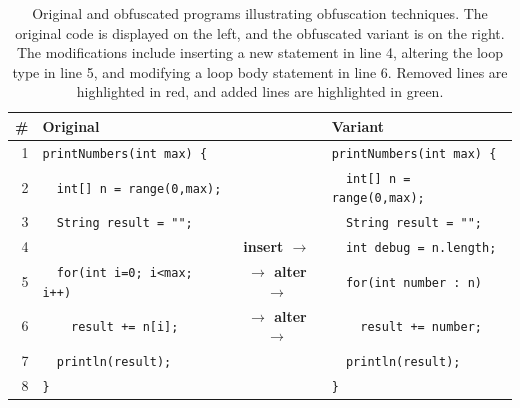 
\begin{samepage}
\begin{table}[p]
	\centering
	\begin{tabular}{rlcl}
		\toprule
		\textbf{\#} & \textbf{Original}                                  &                                    & \textbf{Variant}                                \\
		\midrule
		1           & \texttt{printNumbers(int max) \{}                  &                                    & \texttt{printNumbers(int max) \{}               \\
		2           & \texttt{~~int[] n = range(0,max);}                 &                                    & \texttt{~~int[] n = range(0,max);}              \\
		3           & \texttt{~~String result = "";}                     &                                    & \texttt{~~String result = "";}                  \\
		        
		4           &                                                    & \textbf{\phantom{$\to$}  insert $\to$} & \cellcolor{add}\texttt{~~int debug = n.length;} \\
				
		5           & \cellcolor{del}\texttt{~~for(int i=0; i<max; i++)} & \textbf{$\to$ alter $\to$}   & \cellcolor{add} \texttt{~~for(int number : n)}  \\
		6           & \cellcolor{del}\texttt{~~~~result += n[i];}        & \textbf{$\to$ alter $\to$}   & \cellcolor{add} \texttt{~~~~result += number;}                  \\
		7           & \texttt{~~println(result);}                        &                                    & \texttt{~~println(result);}                     \\
		8           & \texttt{\}}                                        &                                    & \texttt{\}}                                     \\
		\bottomrule
	\end{tabular}
    \caption[Example Obfuscation: Insertion and Alteration]{Original and obfuscated programs illustrating obfuscation techniques. The original code is displayed on the left, and the obfuscated variant is on the right. The modifications include inserting a new statement in line 4, altering the loop type in line 5, and modifying a loop body statement in line 6. Removed lines are highlighted in red, and added lines are highlighted in green.}%
	\label{tab:running-example}
\end{table}



\end{samepage}
